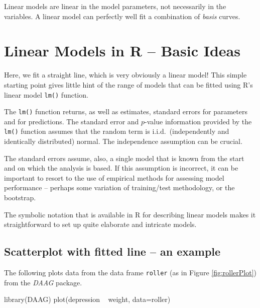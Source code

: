 \documentclass{tufte-book}\usepackage[]{graphicx}\usepackage[]{color}
\newcommand{\txtt}[1]{\texttt{#1}}
\begin{document}
Linear models are linear in the model parameters, not necessarily in
the variables. A linear model can perfectly well fit a combination of
{\em basis} curves.

\section{Linear Models in R -- Basic Ideas}

Here, we fit a straight line, which is very obviously a linear model!
This simple starting point gives little hint of the range of models
that can be fitted using R's linear model \texttt{lm()} function.

The \texttt{lm()} function returns, as well as estimates, standard
errors for parameters and for predictions. The standard error and
$p$-value information provided by the \txtt{lm()} function assumes
that the random term is i.i.d.\ (independently and identically
distributed) normal.  The independence assumption can be crucial.

The standard errors assume, also, a single model that is known from
the start and on which the analysis is based.  If this assumption is incorrect, it can
be important to resort to the use of empirical methods for assessing
model performance -- perhaps some variation of training/test
methodology, or the bootstrap.

The symbolic notation  that is available in R for
describing linear models makes it straightforward to set up quite
elaborate and intricate models.

\subsection*{Scatterplot with fitted line -- an example}

The following plots data from the data frame \texttt{roller} (as in
Figure \ref{fig:rollerPlot}) from the \textit{DAAG} package.
\begin{Schunk}
\begin{Sinput}
library(DAAG)
plot(depression ~ weight, data=roller)
\end{Sinput}
\end{Schunk}
\end{document}
